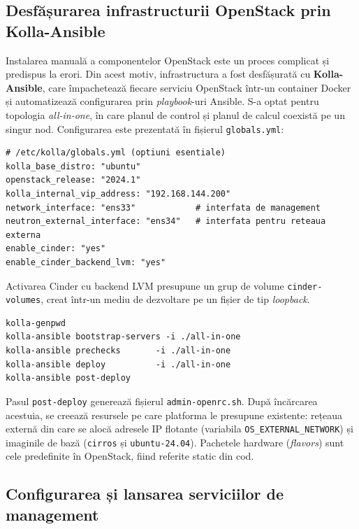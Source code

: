 \subsection{Desfășurarea infrastructurii OpenStack prin Kolla-Ansible}
\label{subsec:cap4_kolla}

Instalarea manuală a componentelor OpenStack este un proces complicat și predispus la erori. Din acest motiv, infrastructura a fost desfășurată cu \textbf{Kolla-Ansible}, care împachetează fiecare serviciu OpenStack într-un container Docker și automatizează configurarea prin \textit{playbook}-uri Ansible. S-a optat pentru topologia \textit{all-in-one}, în care planul de control și planul de calcul coexistă pe un singur nod. Configurarea este prezentată în fișierul \texttt{globals.yml}:

\begin{lstlisting}[basicstyle=\ttfamily\footnotesize,breaklines=true,frame=single]
# /etc/kolla/globals.yml (optiuni esentiale)
kolla_base_distro: "ubuntu"
openstack_release: "2024.1"
kolla_internal_vip_address: "192.168.144.200"
network_interface: "ens33"            # interfata de management
neutron_external_interface: "ens34"   # interfata pentru reteaua externa
enable_cinder: "yes"
enable_cinder_backend_lvm: "yes"
\end{lstlisting}

\noindent Activarea Cinder cu backend LVM presupune un grup de volume \texttt{cinder-volumes}, creat într-un mediu de dezvoltare pe un fișier de tip \textit{loopback}.

\begin{lstlisting}[basicstyle=\ttfamily\footnotesize,breaklines=true,frame=single]
kolla-genpwd
kolla-ansible bootstrap-servers -i ./all-in-one
kolla-ansible prechecks       -i ./all-in-one
kolla-ansible deploy          -i ./all-in-one
kolla-ansible post-deploy
\end{lstlisting}

\noindent Pasul \texttt{post-deploy} generează fișierul \texttt{admin-openrc.sh}. După încărcarea acestuia, se creează resursele pe care platforma le presupune existente: rețeaua externă din care se alocă adresele IP flotante (variabila \texttt{OS\_EXTERNAL\_NETWORK}) și imaginile de bază (\texttt{cirros} și \texttt{ubuntu-24.04}). Pachetele hardware (\textit{flavors}) sunt cele predefinite în OpenStack, fiind referite static din cod.

\subsection{Configurarea și lansarea serviciilor de management}
\label{subsec:cap4_app}

